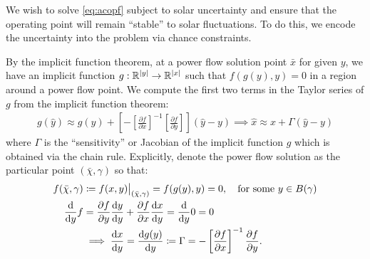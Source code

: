 We wish to solve \cref{eq:acopf} subject to solar uncertainty and ensure that the operating point will remain ``stable'' to solar fluctuations.
To do this, we encode the uncertainty into the problem via chance constraints.

By the implicit function theorem, at a power flow solution point $\bar{x}$ for given $y$, we have an implicit function $g: \mathbb{R}^{|y|}\to\mathbb{R}^{|x|}$ such that $f(g(y), y) = 0$ in a region around a power flow point.
We compute the first two terms in the Taylor series of $g$ from the implicit function theorem:
\begin{align}
g(\hat{y}) \approx g(y) + \left[ -\left[ \frac{\partial f}{\partial x} \right]^{-1} \left[ \frac{\partial f}{\partial y} \right] \right] (\hat{y} - y) \implies \hat{x} \approx x + \Gamma (\hat{y} - y)
\end{align}
where $\Gamma$ is the ``sensitivity'' or Jacobian of the implicit function $g$ which is obtained via the chain rule.
Explicitly, denote the power flow solution as the particular point $(\bar{\chi}, \gamma)$ so that:
\begin{align}
f(\bar{\chi}, \gamma) &\coloneqq f(x,y) \bigr \lvert_{(\bar{\chi}, \gamma)} = f(g(y), y) = 0, \quad \text{for some } y \in B(\gamma) \\
\frac{{\rm d}}{{\rm d}y} f &= \frac{{\partial} f}{{\partial}y} \frac{{\rm d}y}{{\rm d}y} + \frac{{\partial} f}{{\partial}x} \frac{{\rm d}x}{{\rm d}y} = \frac{{\rm d}}{{\rm d}y} 0 = 0 \\
&\implies \frac{{\rm d}x}{{\rm d}y} = \frac{{\rm d}g(y)}{{\rm d}y} \coloneqq \Gamma = -\left[ \frac{{\partial} f}{{\partial}x} \right]^{-1} \frac{{\partial} f}{{\partial}y}.
\end{align}

